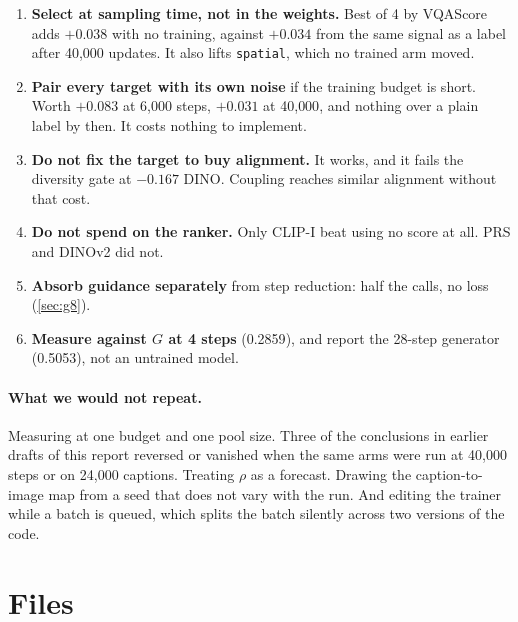 \documentclass[11pt]{article}
\newcommand{\obs}[1]{\textcolor{obsblue}{#1}}
\newcommand{\bad}[1]{\textcolor{badred}{#1}}
\begin{document}
\begin{enumerate}
  \item \textbf{Select at sampling time, not in the weights.} Best of \obs{4} by VQAScore adds
    \obs{$+0.038$} with no training, against \obs{$+0.034$} from the same signal as a label after
    \obs{40{,}000} updates. It also lifts \texttt{spatial}, which no trained arm moved.
  \item \textbf{Pair every target with its own noise} if the training budget is short. Worth
    \obs{$+0.083$} at \obs{6{,}000} steps, \obs{$+0.031$} at \obs{40{,}000}, and nothing over a plain
    label by then. It costs nothing to implement.
  \item \textbf{Do not fix the target to buy alignment.} It works, and it fails the diversity gate at
    \bad{$-0.167$} DINO. Coupling reaches similar alignment without that cost.
  \item \textbf{Do not spend on the ranker.} Only CLIP-I beat using no score at all. PRS and DINOv2
    did not.
  \item \textbf{Absorb guidance separately} from step reduction: half the calls, no loss
    (\cref{sec:g8}).
  \item \textbf{Measure against $G$ at \obs{4} steps} (\obs{0.2859}), and report the \obs{28}-step
    generator (\obs{0.5053}), not an untrained model.
\end{enumerate}

\paragraph{What we would not repeat.}
Measuring at one budget and one pool size. Three of the conclusions in earlier drafts of this report
reversed or vanished when the same arms were run at \obs{40{,}000} steps or on \obs{24{,}000}
captions. Treating $\rho$ as a forecast. Drawing the caption-to-image map from a seed that does not
vary with the run. And editing the trainer while a batch is queued, which splits the batch silently
across two versions of the code.

\section{Files}
\end{document}
